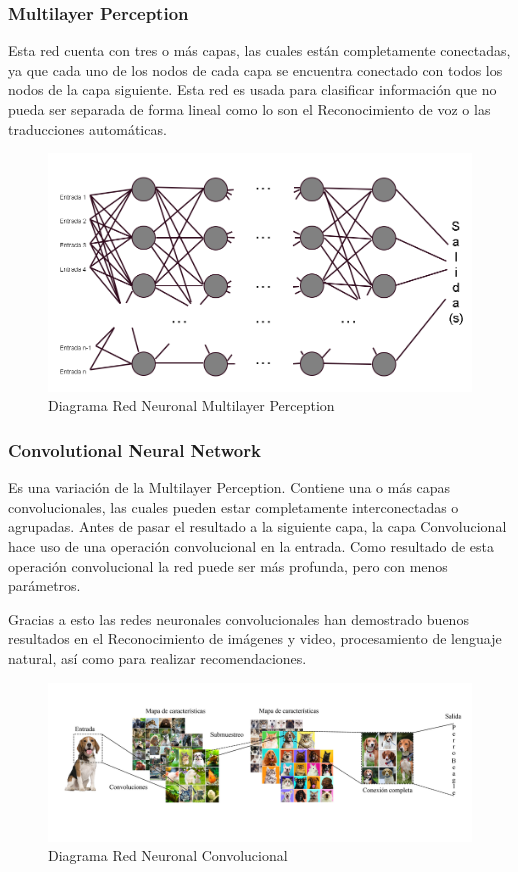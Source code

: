 \documentclass[12pt, a4paper, titlepage]{report}
\begin{document}
				\subsubsection{Multilayer Perception}
				Esta red cuenta con tres o más capas, las cuales están completamente conectadas, ya que cada uno de los nodos de cada capa se encuentra conectado con todos los nodos de la capa siguiente. Esta red es usada para clasificar información que no pueda ser separada de forma lineal como lo son el \Gls{Reconocimiento} de voz o las traducciones automáticas.\cite{refTiposRedesNeu2}\par
				\begin{figure}[H]
					\includegraphics[width=12cm]{./imagenes/MarcoTeorico/RedesN/Multilayer.png}
					\centering 
					\caption{Diagrama Red Neuronal Multilayer Perception}
				\end{figure}
				\subsubsection{Convolutional Neural Network}
				Es una variación de la Multilayer Perception. Contiene una o más capas convolucionales, las cuales pueden estar completamente interconectadas o agrupadas. Antes de pasar el resultado a la siguiente capa, la capa \Gls{Convolucional} hace uso de una operación convolucional en la entrada. Como resultado de esta operación convolucional la red puede ser más profunda, pero con menos parámetros.\par
				Gracias a esto las redes neuronales convolucionales han demostrado buenos resultados en el \Gls{Reconocimiento} de imágenes y video, procesamiento de lenguaje natural, así como para realizar recomendaciones.\cite{refTiposRedesNeu1}\par
				\begin{figure}[H]
					\includegraphics[width=12cm]{./imagenes/MarcoTeorico/RedesN/Convolutional.png}
					\centering 
					\caption{Diagrama Red Neuronal Convolucional}
				\end{figure}
\end{document}
